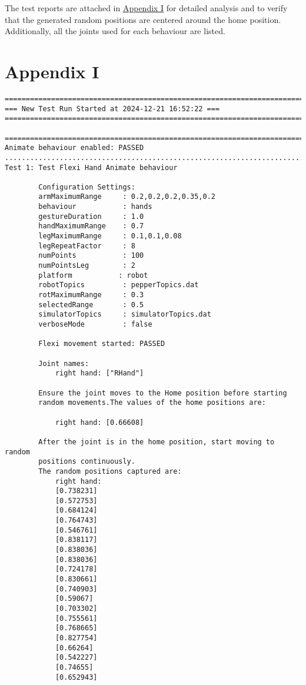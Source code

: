 \documentclass{CSSRforAfrica}
\begin{document}
\noindent The test reports are attached in \hyperref[sec:appendix_I]{\color{blue}Appendix I} for detailed analysis and to verify that the generated random positions are centered around the home position. Additionally, all the joints used for each behaviour are listed.

\newpage
\section*{Appendix I}
\label{sec:appendix_I}
\begin{verbatim}
=======================================================================
=== New Test Run Started at 2024-12-21 16:52:22 ===
=======================================================================

=======================================================================
Animate behaviour enabled: PASSED
........................................................................
Test 1: Test Flexi Hand Animate behaviour

        Configuration Settings:
        armMaximumRange     : 0.2,0.2,0.2,0.35,0.2
        behaviour           : hands
        gestureDuration     : 1.0
        handMaximumRange    : 0.7
        legMaximumRange     : 0.1,0.1,0.08
        legRepeatFactor     : 8
        numPoints           : 100
        numPointsLeg        : 2
        platform           : robot
        robotTopics         : pepperTopics.dat
        rotMaximumRange     : 0.3
        selectedRange       : 0.5
        simulatorTopics     : simulatorTopics.dat
        verboseMode         : false

        Flexi movement started: PASSED

        Joint names:
            right hand: ["RHand"]

        Ensure the joint moves to the Home position before starting 
        random movements.The values of the home positions are:
        
            right hand: [0.66608] 

        After the joint is in the home position, start moving to random 
        positions continuously.
        The random positions captured are:
            right hand: 
            [0.738231] 
            [0.572753] 
            [0.684124] 
            [0.764743] 
            [0.546761] 
            [0.838117] 
            [0.838036] 
            [0.838036] 
            [0.724178] 
            [0.830661] 
            [0.740903] 
            [0.59067] 
            [0.703302] 
            [0.755561] 
            [0.768665] 
            [0.827754] 
            [0.66264] 
            [0.542227] 
            [0.74655] 
            [0.652943] 


\end{verbatim}
\end{document}
